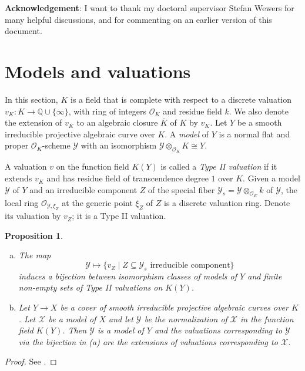 \documentclass[11pt]{amsart}
\newcommand{\BQ}{{\mathbb{Q}}}
\newcommand{\CO}{{\mathcal O}}
\newcommand{\CX}{{\mathcal X}}
\newcommand{\CY}{{\mathcal Y}}
\newtheorem{Prop}[Prin]{Proposition}
\theoremstyle{definition}
\begin{document}
\textbf{Acknowledgement}: I want to thank my doctoral supervisor Stefan Wewers for many helpful discussions, and for commenting on an earlier version of this document.







\section{Models and valuations}

In this section, $K$ is a field that is complete with respect to a discrete valuation $v_K\colon K\to\BQ\cup\{\infty\}$, with ring of integers $\CO_K$ and residue field $k$. We also denote the extension of $v_K$ to an algebraic closure $\overline{K}$ of $K$ by $v_K$. Let $Y$ be a smooth irreducible projective algebraic curve over $K$. A \emph{model} of $Y$ is a normal flat and proper $\CO_K$-scheme $\CY$ with an isomorphism $\CY\otimes_{\CO_K}K\cong Y$.

A valuation $v$ on the function field $K(Y)$ is called a \emph{Type II valuation} if it extends $v_K$ and has residue field of transcendence degree $1$ over $K$. Given a model $\CY$ of $Y$ and an irreducible component $Z$ of the special fiber $\CY_s=\CY\otimes_{\CO_K}k$ of $\CY$, the local ring $\CO_{\CY,\xi_{Z}}$ at the generic point $\xi_{Z}$ of $Z$ is a discrete valuation ring. Denote its valuation by $v_Z$; it is a Type II valuation.

\begin{Prop}
\label{julian-prop}
\begin{enumerate}[(a)]
\item The map
\begin{equation*}
\CY\mapsto\{v_Z\mid Z\subseteq\CY_s\text{ irreducible component}\}
\end{equation*}
induces a bijection between isomorphism classes of models of $Y$ and finite non-empty sets of Type II valuations on $K(Y)$.
\item Let $Y\to X$ be a cover of smooth irreducible projective algebraic curves over $K$. Let $\CX$ be a model of $X$ and let $\CY$ be the normalization of $\CX$ in the function field $K(Y)$. Then $\CY$ is a model of $Y$ and the valuations corresponding to $\CY$ via the bijection in (a) are the extensions of valuations corresponding to $\CX$.
\end{enumerate}
\end{Prop}
\begin{proof}
See \cite[Chapter 3 and Section 5.1.2]{rueth}.
\end{proof}
\end{document}
